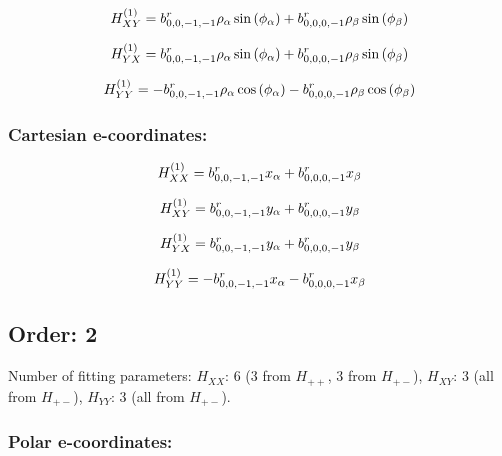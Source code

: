 \documentclass[fleqn]{article}
\begin{document}
\begin{dmath*}
H_{XY}^{(1)}= b^{r}_{0,0,-1,-1} \rho_{\alpha} \sin{\left (\phi_{\alpha} \right )} +  b^{r}_{0,0,0,-1} \rho_{\beta} \sin{\left (\phi_{\beta} \right )}\\
\end{dmath*}

\begin{dmath*}
H_{YX}^{(1)}= b^{r}_{0,0,-1,-1} \rho_{\alpha} \sin{\left (\phi_{\alpha} \right )} +  b^{r}_{0,0,0,-1} \rho_{\beta} \sin{\left (\phi_{\beta} \right )}\\
\end{dmath*}

\begin{dmath*}
H_{YY}^{(1)}=-  b^{r}_{0,0,-1,-1} \rho_{\alpha} \cos{\left (\phi_{\alpha} \right )} -  b^{r}_{0,0,0,-1} \rho_{\beta} \cos{\left (\phi_{\beta} \right )}\\
\end{dmath*}
\subsubsection*{Cartesian e-coordinates:}

\begin{dmath*}
H_{XX}^{(1)}=b^{r}_{0,0,-1,-1} x_{\alpha} + b^{r}_{0,0,0,-1} x_{\beta}\\
\end{dmath*}

\begin{dmath*}
H_{XY}^{(1)}= b^{r}_{0,0,-1,-1} y_{\alpha} +  b^{r}_{0,0,0,-1} y_{\beta}\\
\end{dmath*}

\begin{dmath*}
H_{YX}^{(1)}= b^{r}_{0,0,-1,-1} y_{\alpha} +  b^{r}_{0,0,0,-1} y_{\beta}\\
\end{dmath*}

\begin{dmath*}
H_{YY}^{(1)}=-  b^{r}_{0,0,-1,-1} x_{\alpha} -  b^{r}_{0,0,0,-1} x_{\beta}\\
\end{dmath*}
\subsection{Order: 2}
Number of fitting parameters: $H_{XX}$: $6$ ($3$ from $H_{++}$, $3$ from $H_{+-}$), $H_{XY}$: $3$ (all from $H_{+-}$), $H_{YY}$: $3$ (all from $H_{+-}$).
\subsubsection*{Polar e-coordinates:}
\end{document}
